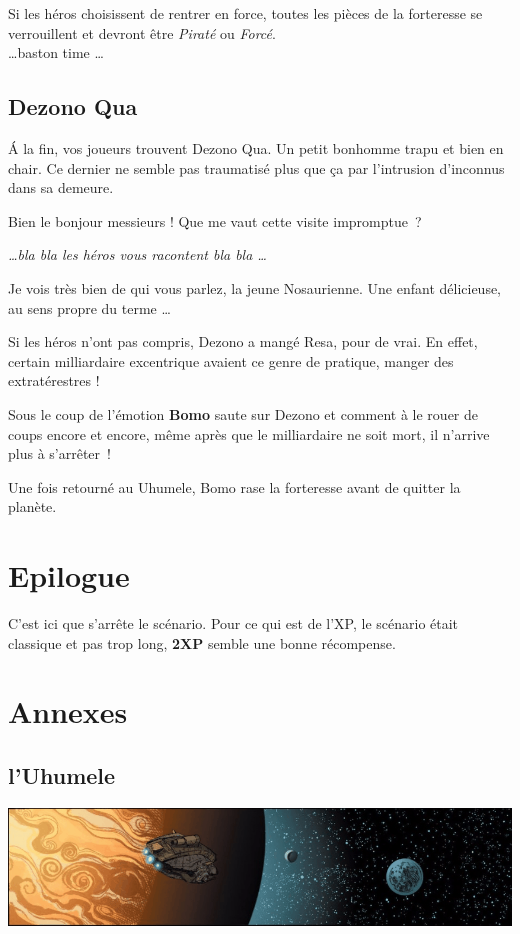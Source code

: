 \documentclass{jdrp}
\begin{document}
	Si les héros choisissent de rentrer en force, toutes les pièces de la forteresse se verrouillent et devront être \textit{Piraté} ou \textit{Forcé}.\\

	\ldots baston time \ldots \\

	\subsection{Dezono Qua}
	\'A la fin, vos joueurs trouvent Dezono Qua. Un petit bonhomme trapu et bien en chair. Ce dernier ne semble pas traumatisé plus que ça par l’intrusion d’inconnus dans sa demeure.

	\begin{quotebox}
    	Bien le bonjour messieurs ! Que me vaut cette visite impromptue~?

    	\textit{\ldots bla bla les héros vous racontent bla bla \ldots}

    	Je vois très bien de qui vous parlez, la jeune Nosaurienne. Une enfant délicieuse, au sens propre du terme \ldots
	\end{quotebox}

	Si les héros n'ont pas compris, Dezono a mangé Resa, pour de vrai. En effet, certain milliardaire excentrique avaient ce genre de pratique, manger des extratérestres !

	Sous le coup de l’émotion \textbf{Bomo} saute sur Dezono et comment à le rouer de coups encore et encore, même après que le milliardaire ne soit mort, il n’arrive plus à s’arrêter~!

	Une fois retourné au Uhumele, Bomo rase la forteresse avant de quitter la planète.

	\section{Epilogue}
	C’est ici que s’arrête le scénario. Pour ce qui est de l’XP, le scénario était classique et pas trop long, \textbf{2XP} semble une bonne récompense.


	\newpage
	\section{Annexes}
	\subsection{l’Uhumele}\label{sec:uhumele}
	\noindent\includegraphics[width=\textwidth]{_img/uhumele-pano.png}
\end{document}
